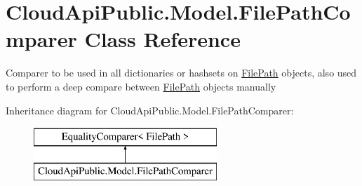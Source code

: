 \hypertarget{class_cloud_api_public_1_1_model_1_1_file_path_comparer}{\section{Cloud\-Api\-Public.\-Model.\-File\-Path\-Comparer Class Reference}
\label{class_cloud_api_public_1_1_model_1_1_file_path_comparer}
}


Comparer to be used in all dictionaries or hashsets on \hyperlink{class_cloud_api_public_1_1_model_1_1_file_path}{File\-Path} objects, also used to perform a deep compare between \hyperlink{class_cloud_api_public_1_1_model_1_1_file_path}{File\-Path} objects manually  


Inheritance diagram for Cloud\-Api\-Public.\-Model.\-File\-Path\-Comparer\-:\begin{figure}[H]
\begin{center}
\leavevmode
\includegraphics[height=2.000000cm]{class_cloud_api_public_1_1_model_1_1_file_path_comparer}
\end{center}
\end{figure}
